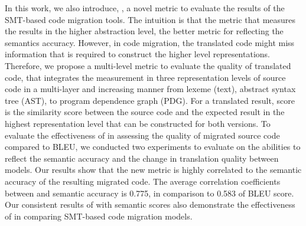 
In this work, we also introduce, {\model}, a novel metric to evaluate
the results of the SMT-based code migration tools. The intuition is
that the metric that measures the results in the higher abstraction
level, the better metric for reflecting the semantics
accuracy. However, in code migration, the translated code might miss
information that is required to construct the higher level
representations. Therefore, we propose a multi-level metric to
evaluate the quality of translated code, that integrates the
measurement in three representation levels of source code in a
multi-layer and increasing manner from lexeme (text), abstract syntax
tree (AST), to program dependence graph (PDG). For a translated
result, {\model} score is the similarity score between the source
code and the expected result in the highest representation level that
can be constructed for both versions. To evaluate the effectiveness of
{\model} in assessing the quality of migrated source code compared to
BLEU, we conducted two experiments to evaluate {\model} on the
abilities to reflect the semantic accuracy and the change in
translation quality between models. Our results show that the new
metric {\model} is highly correlated to the semantic accuracy of the
resulting migrated code. The average correlation coefficients between
{\model} and semantic accuracy is 0.775, in comparison to 0.583 of
BLEU score.  Our consistent results of {\model} with semantic scores
also demonstrate the effectiveness of {\model} in comparing SMT-based
code migration models.

